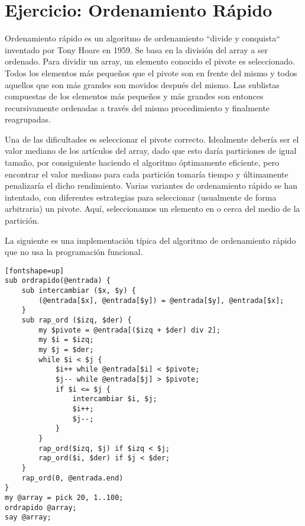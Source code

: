 \section{Ejercicio: Ordenamiento Rápido}
\label{quicksort}

\begin{exercise}
Ordenamiento rápido es un algoritmo de ordenamiento ``divide y conquista``
inventado por Tony Hoare en 1959. Se basa en la división del array
a ser ordenado. Para dividir un array, un elemento conocido el pivote
es seleccionado. Todos los elementos más pequeños que el pivote son
en frente del mismo y todos aquellos que son más grandes son movidos
después del mismo. Las sublistas compuestas de los elementos más pequeños
y más grandes son entonces recursivamente ordenadas a través del mismo 
procedimiento y finalmente reagrupadas.

Una de las dificultades es seleccionar el pivote correcto. Idealmente
debería ser el valor mediano de los artículos del array, dado que
esto daría particiones de igual tamaño, por consiguiente haciendo el 
algoritmo óptimamente eficiente, pero encontrar el valor mediano 
para cada partición tomaría tiempo y últimamente penalizaría el
dicho rendimiento. Varias variantes de ordenamiento rápido se han 
intentado, con diferentes estrategias para seleccionar (usualmente de
forma arbitraria) un pivote. Aquí, seleccionamos un elemento en o
cerca del medio de la partición.

La siguiente es una implementación típica del algoritmo de 
ordenamiento rápido que no usa la programación funcional.

\begin{verbatim}[fontshape=up]
sub ordrapido(@entrada) {
    sub intercambiar ($x, $y) {
        (@entrada[$x], @entrada[$y]) = @entrada[$y], @entrada[$x];
    }
    sub rap_ord ($izq, $der) {
        my $pivote = @entrada[($izq + $der) div 2];
        my $i = $izq;
        my $j = $der;
        while $i < $j {
            $i++ while @entrada[$i] < $pivote;
            $j-- while @entrada[$j] > $pivote;
            if $i <= $j {
                intercambiar $i, $j;
                $i++;
                $j--;
            }
        }
        rap_ord($izq, $j) if $izq < $j;
        rap_ord($i, $der) if $j < $der;
    }
    rap_ord(0, @entrada.end)
}
my @array = pick 20, 1..100;
ordrapido @array;
say @array;
\end{verbatim}


\end{exercise}
